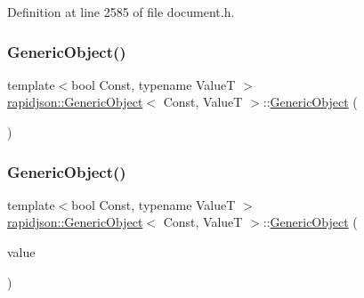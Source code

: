 Definition at line 2585 of file document.\+h.


\begin{DoxyCode}{0}

\end{DoxyCode}
\mbox{\label{classrapidjson_1_1_generic_object_a71aeb6b731919dfe73aabb353b5a1d5c}} 
\subsubsection{\texorpdfstring{GenericObject()}{GenericObject()}\hspace{0.1cm}{\footnotesize\ttfamily [2/3]}}
{\footnotesize\ttfamily template$<$bool Const, typename ValueT $>$ \\
\mbox{\hyperlink{classrapidjson_1_1_generic_object}{rapidjson\+::\+Generic\+Object}}$<$ Const, ValueT $>$\+::\mbox{\hyperlink{classrapidjson_1_1_generic_object}{Generic\+Object}} (\begin{DoxyParamCaption}{ }\end{DoxyParamCaption})\hspace{0.3cm}{\ttfamily [private]}}

\mbox{\label{classrapidjson_1_1_generic_object_adf7b4532bb38b41ffb24f7663031b21a}} 
\subsubsection{\texorpdfstring{GenericObject()}{GenericObject()}\hspace{0.1cm}{\footnotesize\ttfamily [3/3]}}
{\footnotesize\ttfamily template$<$bool Const, typename ValueT $>$ \\
\mbox{\hyperlink{classrapidjson_1_1_generic_object}{rapidjson\+::\+Generic\+Object}}$<$ Const, ValueT $>$\+::\mbox{\hyperlink{classrapidjson_1_1_generic_object}{Generic\+Object}} (\begin{DoxyParamCaption}\item[{\mbox{\hyperlink{classrapidjson_1_1_generic_object_a282660500748eff5ebab93b88a9d478f}{Value\+Type}} \&}]{value }\end{DoxyParamCaption})\hspace{0.3cm}{\ttfamily [private]}}



